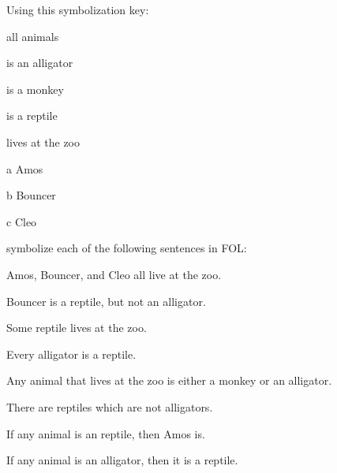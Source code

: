 \solutions
\problempart\label{pr.FOLalligators}
Using this symbolization key:
\begin{ekey}
\item[\text{论域}] all animals
\item[\atom{A}{x}]  is an alligator
\item[\atom{M}{x}]  is a monkey
\item[\atom{R}{x}]  is a reptile
\item[\atom{Z}{x}]  lives at the zoo
\item[a] Amos
\item[b] Bouncer
\item[c] Cleo
\end{ekey}
symbolize each of the following sentences in FOL:
\begin{compactlist}
\item Amos, Bouncer, and Cleo all live at the zoo.
\item[] 
\item Bouncer is a reptile, but not an alligator.
\item[] 
\item Some reptile lives at the zoo.
\item[] 
\item Every alligator is a reptile.
\item[] 
\item Any animal that lives at the zoo is either a monkey or an alligator.
\item[] 
\item There are reptiles which are not alligators.
\item[] 
\item If any animal is an reptile, then Amos is.
\item[] 
\item If any animal is an alligator, then it is a reptile.
\item[] 
\end{compactlist}


